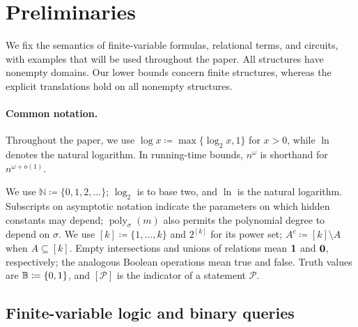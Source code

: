 
\section{Preliminaries}\label{sec:aggregation}
We fix the semantics of finite-variable formulas, relational terms, and
circuits, with examples that will be used throughout the paper. All
structures have nonempty domains. Our lower bounds concern finite
structures, whereas the explicit translations hold on all nonempty
structures.

\paragraph{Common notation.}

Throughout the paper,
we use $\log x\coloneqq\max\{\log_2 x,1\}$ for $x>0$,
while $\ln$ denotes the natural logarithm.
In running-time bounds, $n^\omega$ is shorthand for $n^{\omega+o(1)}$.

We use $\mathbb N\coloneqq\{0,1,2,\ldots\}$; $\log_2$ is to base two,
and $\ln$ is the natural logarithm. Subscripts on asymptotic notation
indicate the parameters on which hidden constants may depend;
$\operatorname{poly}_\sigma(m)$ also permits the polynomial degree to
depend on $\sigma$.
We use $[k]\coloneqq\{1,\ldots,k\}$ and $2^{[k]}$ for its power set;
$A^c\coloneqq[k]\setminus A$ when $A\subseteq[k]$. Empty intersections and
unions of relations mean $\mathbf{1}$ and $\mathbf{0}$, respectively; the
analogous Boolean operations mean true and false. Truth values are
$\mathbb B\coloneqq\{0,1\}$, and $[\mathcal P]$ is the indicator of a statement
$\mathcal P$.

\subsection{Finite-variable logic and binary queries}\label{sec:prelim-logic}
